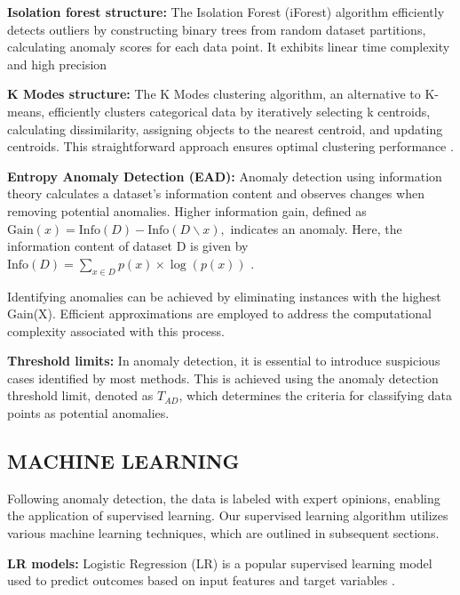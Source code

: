 \documentclass[12pt]{article}
\begin{document}
\textbf{\small Isolation forest structure:} The Isolation Forest
(iForest) algorithm efficiently detects outliers by constructing
binary trees from random dataset partitions, calculating anomaly
scores for each data point. It exhibits linear time complexity and
high precision \cite{A52}

\textbf{\small K Modes structure:} The K Modes clustering
algorithm, an alternative to K-means, efficiently clusters
categorical data by iteratively selecting k centroids, calculating
dissimilarity, assigning objects to the nearest centroid, and
updating centroids. This straightforward approach ensures optimal
clustering performance \cite{A60	}.

\textbf{\small Entropy Anomaly Detection (EAD):} Anomaly detection
using information theory calculates a dataset's information
content and observes changes when removing potential anomalies.
Higher information gain, defined as $\text{Gain}(x) =
\text{Info}(D) - \text{Info}(D \backslash x),$ indicates an
anomaly. Here, the information content of dataset D is given by
$\text{Info}(D) = \sum_{x \in D} p(x) \times \log(p(x))$
\cite{A57}.

Identifying anomalies can be achieved by eliminating instances
with the highest Gain(X). Efficient approximations are employed to
address the computational complexity associated with this process.

\textbf{\small Threshold limits:} In anomaly detection, it is
essential to introduce suspicious cases identified by most
methods. This is achieved using the anomaly detection threshold
limit, denoted as $T_{AD}$, which determines the criteria for
classifying data points as potential anomalies.


\subsection{MACHINE LEARNING}\label{SSC:ML}
Following anomaly detection, the data is labeled with expert
opinions, enabling the application of supervised learning. Our
supervised learning algorithm utilizes various machine learning
techniques, which are outlined in subsequent sections.

\textbf{\small LR models:} Logistic Regression (LR) is a popular
supervised learning model used to predict outcomes based on input
features and target variables \cite{A52}.
\end{document}
